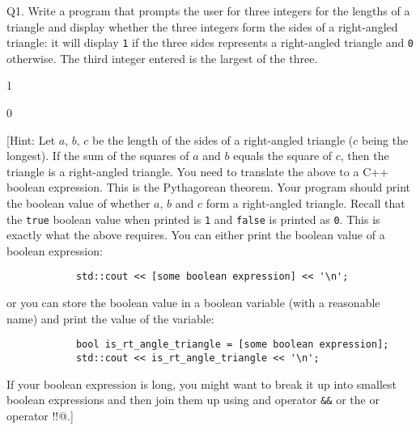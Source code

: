 Q1. Write a program that prompts the user for three integers for the lengths of a
triangle and display whether the three integers form the sides of a
right-angled triangle: it will display \verb!1! if the three sides represents
a right-angled triangle and \verb!0! otherwise. The third integer entered is
the largest of the three.

\resett
\nextt
\begin{console}[commandchars=\\\{\}]
1
\end{console}

\nextt
\begin{console}[commandchars=\\\{\}]
0
\end{console}

[Hint: Let $a$, $b$, $c$ be the length of the sides of a right-angled triangle
($c$ being the longest). If the sum of the squares of $a$ and $b$ equals the
square of $c$, then the triangle is a right-angled triangle. You need to
translate the above to a C++ boolean expression. This is the Pythagorean
theorem. Your program should print the boolean value of whether $a$, $b$ and
$c$ form a right-angled triangle. Recall that the \verb!true! boolean value
when printed is \verb!1! and \verb!false! is printed as \verb!0!. This is
exactly what the above requires. You can either print the boolean value of a
boolean expression:
\begin{verbatim}
            std::cout << [some boolean expression] << '\n';
\end{verbatim}
or you can store the boolean value in a boolean variable (with a reasonable
name) and print the value of the variable:
\begin{verbatim}
            bool is_rt_angle_triangle = [some boolean expression];
            std::cout << is_rt_angle_triangle << '\n';
\end{verbatim}
If your boolean expression is long, you might want to break it up into
smallest boolean expressions
and then join them up using and operator \verb!&&! or the or operator
\verb@!!@.]
